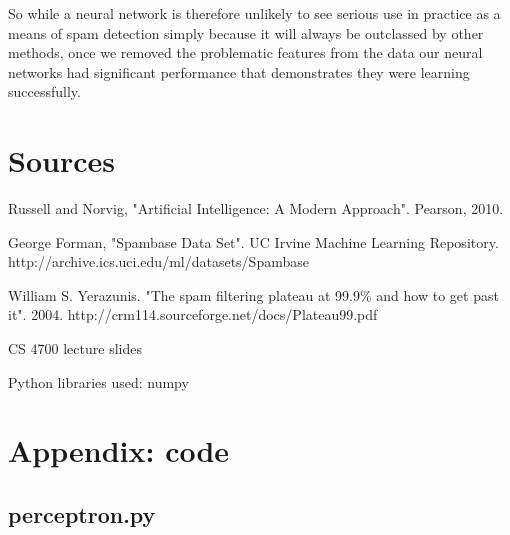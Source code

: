 \documentclass[11pt]{article} %
\begin{document}
So while a neural network is therefore unlikely to see serious use in practice as a means of spam detection simply because it will always be outclassed by other methods, once we removed the problematic features from the data our neural networks had significant performance that demonstrates they were learning successfully.

\section{Sources}

Russell and Norvig, "Artificial Intelligence: A Modern Approach". Pearson, 2010.
\bigskip

George Forman, "Spambase Data Set". UC Irvine Machine Learning Repository.
http://archive.ics.uci.edu/ml/datasets/Spambase
\bigskip

William S. Yerazunis. "The spam filtering plateau at 99.9$\%$ and how to get past it". 2004.
http://crm114.sourceforge.net/docs/Plateau99.pdf
\bigskip

CS 4700 lecture slides
\bigskip

Python libraries used: numpy
\singlespacing
\section{Appendix: code}

\subsection{perceptron.py}
\end{document}

